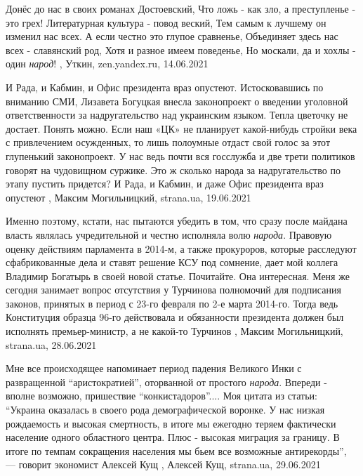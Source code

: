 Донёс до нас в своих романах Достоевский, Что ложь - как зло, а преступленье -
это грех! Литературная культура - повод веский, Тем самым к лучшему он изменил
нас всех. А если честно это глупое сравненье, Объединяет здесь нас всех -
славянский род, Хотя и разное имеем поведенье, Но москали, да и хохлы - один
\emph{народ}!
, 
Уткин, zen.yandex.ru, 14.06.2021

И Рада, и Кабмин, и Офис президента враз опустеют. Истосковавшись по вниманию
СМИ, Лизавета Богуцкая внесла законопроект о введении уголовной ответственности
за надругательство над украинским языком. Тепла цветочку не достает. Понять
можно.  Если наш «ЦК» не планирует какой-нибудь стройки века с привлечением
осужденных, то лишь полоумные отдаст свой голос за этот глупенький
законопроект.  У нас ведь почти вся госслужба и две трети политиков говорят на
чудовищном суржике. Это ж сколько народа за надругательство по этапу пустить
придется? И Рада, и Кабмин, и даже Офис президента враз опустеют
, 
Максим Могильницкий, strana.ua, 19.06.2021


Именно поэтому, кстати, нас пытаются убедить в том, что сразу после майдана
власть являлась учредительной и честно исполняла волю \emph{народа}.  Правовую оценку
действиям парламента в 2014-м, а также прокуроров, которые расследуют
сфабрикованные дела и ставят решение КСУ под сомнение, дает мой коллега
Владимир Богатырь в своей новой статье. Почитайте. Она интересная.  Меня же
сегодня занимает вопрос отсутствия у Турчинова полномочий для подписания
законов, принятых в период с 23-го февраля по 2-е марта 2014-го. Тогда ведь
Конституция образца 96-го действовала и обязанности президента должен был
исполнять премьер-министр, а не какой-то Турчинов
, 
Максим Могильницкий, strana.ua, 28.06.2021


Мне все происходящее напоминает период падения Великого Инки с развращенной
\enquote{аристократией}, оторванной от простого \emph{народа}. Впереди - вполне возможно,
пришествие \enquote{конкистадоров}....  Моя цитата из статьи: \enquote{Украина оказалась в
своего рода демографической воронке.  У нас низкая рождаемость и высокая
смертность, в итоге мы ежегодно теряем фактически население одного областного
центра. Плюс - высокая миграция за границу.  В итоге по темпам сокращения
населения мы бьем все возможные антирекорды}, — говорит экономист Алексей Кущ
, 
Алексей Кущ, strana.ua, 29.06.2021

